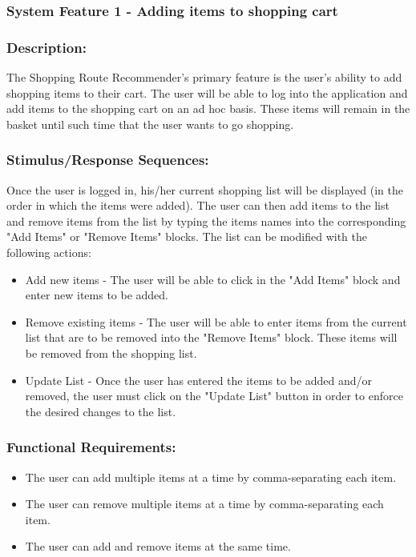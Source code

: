\documentclass[10pt,twocolumn]{witseiepaper}
\begin{document}
		\subsubsection{System Feature 1 - Adding items to shopping cart}
		\label{featureadd}
		
		\subsubsection*{Description:}
		
		The Shopping Route Recommender's primary feature is the user's ability to add shopping items to their cart. The user will be able to log into the application and add items to the shopping cart on an ad hoc basis. These items will remain in the basket until such time that the user wants to go shopping. 
		
		\subsubsection*{Stimulus/Response Sequences:}
		
		Once the user is logged in, his/her current shopping list will be displayed (in the order in which the items were added). The user can then add items to the list and remove items from the list by typing the items names into the corresponding "Add Items" or "Remove Items" blocks. The list can be modified with the following actions:
		
		\begin{itemize}
			\item Add new items - The user will be able to click in the "Add Items" block and enter new items to be added. 
			\item Remove existing items - The user will be able to enter items from the current list that are to be removed into the "Remove Items" block. These items will be removed from the shopping list.
			\item Update List - Once the user has entered the items to be added and/or removed, the user must click on the "Update List" button in order to enforce the desired changes to the list.
		\end{itemize}
		
		\subsubsection*{Functional Requirements:}
		
		\begin{itemize}
			\item The user can add multiple items at a time by comma-separating each item.
			\item The user can remove multiple items at a time by comma-separating each item.
			\item The user can add and remove items at the same time.
		\end{itemize}
		
\end{document}

